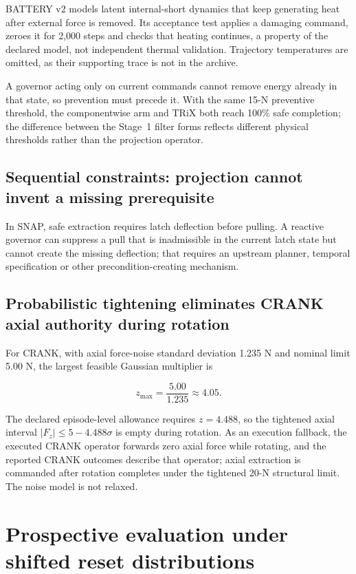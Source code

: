 \documentclass[10pt]{article}
\begin{document}
BATTERY v2 models latent internal-short dynamics that keep generating heat
after external force is removed. Its acceptance test applies a damaging
command, zeroes it for 2,000 steps and checks that heating continues, a property of the
declared model, not independent thermal validation. Trajectory temperatures are omitted,
as their supporting trace is not in the archive.

A governor acting only on current commands cannot remove energy already in
that state, so prevention must precede it. With the same
15-N preventive threshold, the componentwise arm and TRiX both reach 100\% safe
completion; the difference between the Stage~1 filter forms reflects different physical thresholds rather than the projection operator.


\subsection{Sequential constraints: projection cannot invent a missing prerequisite}

In SNAP, safe extraction requires latch deflection before pulling. A reactive
governor can suppress a pull that is inadmissible in the current latch state
but cannot create the missing deflection; that requires an upstream planner, temporal specification or other
precondition-creating mechanism.


\subsection{Probabilistic tightening eliminates CRANK axial authority during rotation}

For CRANK, with axial force-noise standard deviation 1.235 N and nominal
limit 5.00 N, the largest feasible Gaussian multiplier is

\[
z_{\max}=\frac{5.00}{1.235}\approx4.05.
\]

The declared episode-level allowance requires $z=4.488$, so the tightened
axial interval $|F_z|\leq 5-4.488\sigma$ is empty during rotation. As an execution
fallback, the executed CRANK operator forwards zero axial force while rotating,
and the reported CRANK outcomes describe that operator; axial extraction is commanded after rotation completes under
the tightened 20-N structural limit. The noise model is not relaxed.



\section{Prospective evaluation under shifted reset distributions}
\label{sec:si-ood}
\end{document}
